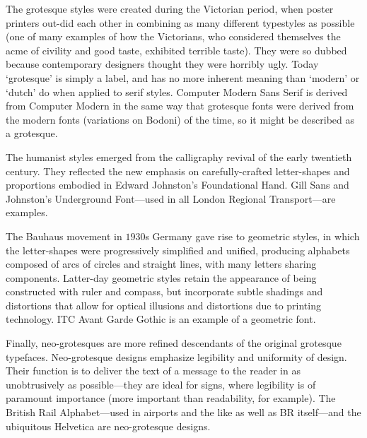 	The grotesque styles were created during the Victorian period,
	when poster printers out-did each other in combining as many
	different typestyles as possible (one of many examples of how
	the Victorians, who considered themselves the acme of civility
	and good taste, exhibited terrible taste).  They were so dubbed
	because contemporary designers thought they were horribly ugly.
	Today `grotesque' is simply a label, and has no more inherent
	meaning than `modern' or `dutch' do when applied to serif
	styles.  Computer Modern Sans Serif is derived from Computer
	Modern in the same way that grotesque fonts were derived from
	the modern fonts (variations on Bodoni) of the time, so it might
	be described as a grotesque.


	The humanist styles emerged from the calligraphy revival of the
	early twentieth century.  They reflected the new emphasis on
	carefully-crafted letter-shapes and proportions embodied in
	Edward Johnston's Foundational Hand.  Gill Sans and Johnston's
	Underground Font---used in all London Regional Transport---are
	examples.


	The Bauhaus movement in $1930$s Germany gave rise to geometric
	styles, in which the letter-shapes were progressively simplified
	and unified, producing alphabets composed of arcs of circles and
	straight lines, with many letters sharing components.
	Latter-day geometric styles retain the appearance of being
	constructed with ruler and compass, but incorporate subtle
	shadings and distortions that allow for optical illusions and
	distortions due to printing technology.  ITC Avant Garde Gothic
	is an example of a geometric font.


	Finally, neo-grotesques are more refined descendants of the
	original grotesque typefaces.  Neo-grotesque designs emphasize
	legibility and uniformity of design.  Their function is to
	deliver the text of a message to the reader in as unobtrusively
	as possible---they are ideal for signs, where legibility is of
	paramount importance (more important than readability, for
	example).  The British Rail Alphabet---used in airports and the
	like as well as BR itself---and the ubiquitous Helvetica are
	neo-grotesque designs.


